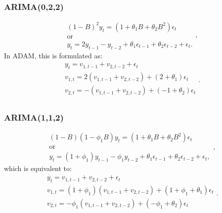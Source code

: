 \documentclass[
]{book}
\theoremstyle{definition}
\theoremstyle{definition}
\theoremstyle{definition}
\theoremstyle{definition}
\theoremstyle{remark}
\begin{document}
\hypertarget{arima022}{%
\subsubsection{ARIMA(0,2,2)}\label{arima022}}

\begin{equation*}
    \begin{aligned}
        &(1-B)^2 y_t = (1 + \theta_1 B + \theta_2 B^2) \epsilon_t \\
        &\text{or} \\
        &y_{t} = 2 y_{t-1} - y_{t-2} + \theta_1 \epsilon_{t-1} + \theta_2 \epsilon_{t-2} + \epsilon_t .
    \end{aligned},
\end{equation*}
In ADAM, this is formulated as:
\begin{equation}
  \begin{aligned}
    &{y}_{t} = v_{1,t-1} + v_{2,t-2} + \epsilon_t \\
    &v_{1,t} = 2(v_{1,t-1} + v_{2,t-2}) + (2 + \theta_1) \epsilon_{t} \\
    &v_{2,t} = -(v_{1,t-1} + v_{2,t-2}) + (-1 + \theta_2) \epsilon_{t} \\
  \end{aligned}.
  \label{eq:ADAMARIMAExpanded022}
\end{equation}

\hypertarget{arima112}{%
\subsubsection{ARIMA(1,1,2)}\label{arima112}}

\begin{equation*}
    \begin{aligned}
        &(1-B) (1-\phi_1 B) y_t = (1 + \theta_1 B + \theta_2 B^2) \epsilon_t \\
        &\text{or} \\
        &y_{t} = (1+\phi_1) y_{t-1} - \phi_1 y_{t-2} + \theta_1 \epsilon_{t-1} + \theta_2 \epsilon_{t-2} + \epsilon_t,
    \end{aligned},
\end{equation*}
which is equivalent to:
\begin{equation}
  \begin{aligned}
    &{y}_{t} = v_{1,t-1} + v_{2,t-2} + \epsilon_t \\
    &v_{1,t} = (1+\phi_1)(v_{1,t-1} + v_{2,t-2}) + (1 + \phi_1 + \theta_1) \epsilon_{t} \\
    &v_{2,t} = -\phi_1(v_{1,t-1} + v_{2,t-2}) + (-\phi_1 + \theta_2) \epsilon_{t} \\
  \end{aligned}.
  \label{eq:ADAMARIMAExpanded112}
\end{equation}
\end{document}

